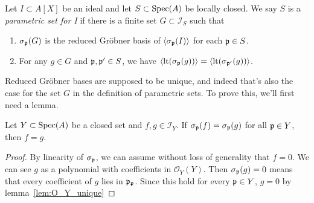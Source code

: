 \begin{definition}
  Let $I \subset A[X]$ be an ideal and let $S \subset \operatorname{Spec}(A)$ be locally closed. We say $S$ is a \textit{parametric set for I} if there is a finite set $G \subset \mathcal I_{S}$ such that
  \begin{enumerate}
    \item $\sigma_{\mathfrak p}(G)$ is the reduced Gröbner basis of $\langle \sigma_{\mathfrak p}(I) \rangle$ for each $\mathfrak p \in S$.
    \item For any $g \in G$ and $\mathfrak p, \mathfrak p' \in S$, we have $\langle \operatorname{lt}(\sigma_{\mathfrak p}(g)) \rangle = \langle \operatorname{lt}(\sigma_{\mathfrak p'}(g)) \rangle$.
  \end{enumerate}
\end{definition}

Reduced Gröbner bases are supposed to be unique, and indeed that's also the case for the set $G$ in the definition of parametric sets. To prove this, we'll first need a lemma.

\begin{lemma}\label{lem:parametric_grb_unique}
  Let $Y \subset \operatorname{Spec}(A)$ be a closed set and $f, g \in \mathcal I_{Y}$. If $\sigma_{\mathfrak p}(f) = \sigma_{\mathfrak p}(g)$ for all $\mathfrak p \in Y$, then $f = g$.
\end{lemma}
\begin{proof}
  By linearity of $\sigma_{\mathfrak p}$, we can assume without loss of generality that $f = 0$. We can see $g$ as a polynomial with coefficients in $\mathcal O_{Y}(Y)$. Then $\sigma_{\mathfrak p}(g) = 0$ means that every coefficient of $g$ lies in $\mathfrak p_{\mathfrak p}$. Since this hold for every $\mathfrak p \in Y$, $g = 0$ by lemma~\ref{lem:O_Y_unique}
\end{proof}

